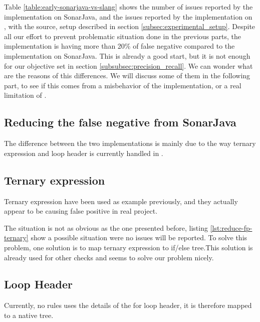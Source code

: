 Table \ref{table:early-sonarjava-vs-slang} shows the number of issues reported by the implementation on SonarJava, and the issues reported by the implementation on \slang, with the source, setup described in section \ref{subsec:experimental_setup}. 
Despite all our effort to prevent problematic situation done in the previous parts,  the implementation is having more than 20\% of false negative compared to the implementation on SonarJava. This is already a good start, but it is not enough for our objective set in section \ref{subsubsec:precision_recall}.
We can wonder what are the reasons of this differences.
We will discuss some of them in the following part, to see if this comes from a misbehavior of the implementation, or a real limitation of \slang.

\subsection{Reducing the false negative from SonarJava}
\label{subsec:reducing_false_positive_sonarjava}

The difference between the two implementations is mainly due to the way ternary expression and loop header is currently handled in \slang.

\subsection{Ternary expression}
\label{subsec:reducing_false_positive_ternary}
Ternary expression have been used as example previously, and they actually appear to be causing false positive in real project.



The situation is not as obvious as the one presented before, listing \ref{lst:reduce-fp-ternary} show a possible situation were no issues will be reported. To solve this problem, one solution is to map ternary expression to if/else tree.This solution is already used for other checks and seems to solve our problem nicely.

\subsection{Loop Header}
\label{subsec:loop_header}

Currently, no rules uses the details of the for loop header, it is therefore mapped to a native tree. 

